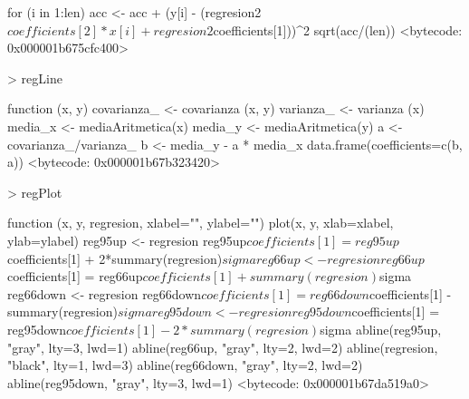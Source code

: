 \documentclass [a4paper] {article}
\begin{document}
\begin{Schunk}
\begin{Soutput}
{  for (i in 1:len){
    acc <- acc + (y[i] - (regresion2$coefficients[2]*x[i]+regresion2$coefficients[1]))^2
  }
  sqrt(acc/(len))
}
<bytecode: 0x000001b675cfc400>
\end{Soutput}
\begin{Sinput}
> regLine
\end{Sinput}
\begin{Soutput}
function (x, y) {
  covarianza_ <- covarianza (x, y)
  varianza_ <- varianza (x)
  media_x <- mediaAritmetica(x)
  media_y <- mediaAritmetica(y)
  a <- covarianza_/varianza_
  b <- media_y - a * media_x
  data.frame(coefficients=c(b, a))
}
<bytecode: 0x000001b67b323420>
\end{Soutput}
\begin{Sinput}
> regPlot
\end{Sinput}
\begin{Soutput}
function (x, y, regresion, xlabel="", ylabel="") {
  plot(x, y, xlab=xlabel, ylab=ylabel)
  reg95up <- regresion
  reg95up$coefficients[1] = reg95up$coefficients[1] + 2*summary(regresion)$sigma
  reg66up <- regresion
  reg66up$coefficients[1] = reg66up$coefficients[1] + summary(regresion)$sigma
  reg66down <- regresion
  reg66down$coefficients[1] = reg66down$coefficients[1] - summary(regresion)$sigma
  reg95down <- regresion
  reg95down$coefficients[1] = reg95down$coefficients[1] - 2*summary(regresion)$sigma
  abline(reg95up, "gray", lty=3, lwd=1)
  abline(reg66up, "gray", lty=2, lwd=2)
  abline(regresion, "black", lty=1, lwd=3)
  abline(reg66down, "gray", lty=2, lwd=2)
  abline(reg95down, "gray", lty=3, lwd=1)
}
<bytecode: 0x000001b67da519a0>
\end{Soutput}
\end{Schunk}
\end{document}
